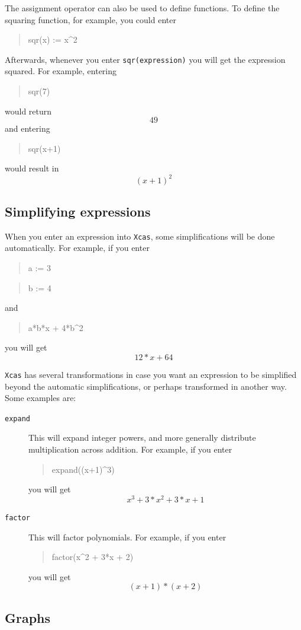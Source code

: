 \documentclass{article}
\newcommand{\xcasin}[1]
{\begin{quote}\ttfamily
#1
\end{quote}}
\newcommand{\xcasout}[1]
{\begin{equation*}
#1
\end{equation*}}
\begin{document}
The assignment operator can also be used to define functions.  To
define the squaring function, for example, you could enter
\xcasin{sqr(x) := x\^{}2}
Afterwards, whenever you enter \texttt{sqr(expression)} you will
get the expression squared.  For example, entering
\xcasin{sqr(7)}
would return
\xcasout{49}
and entering
\xcasin{sqr(x+1)}
would result in
\xcasout{(x+1)^2}

\subsection{Simplifying expressions}

When you enter an expression into \texttt{Xcas}, some simplifications
will be done automatically.  For example, if you enter
\xcasin{a := 3}
\xcasin{b := 4}
and
\xcasin{a*b*x + 4*b\^{}2}
you will get
\xcasout{12*x + 64}

\texttt{Xcas} has several transformations in case you want an
expression to be simplified beyond the automatic simplifications, or
perhaps transformed in another way.  Some examples are:
\begin{description}
  \item[\texttt{expand}]
  This will expand integer powers, and more generally distribute
  multiplication across addition.  For example, if you enter
  \xcasin{expand((x+1)\^{}3)}
  you will get
  \xcasout{x^3 + 3*x^2 + 3*x + 1}
  
  \item[\texttt{factor}]
  This will factor polynomials.  For example, if you enter
  \xcasin{factor(x\^{}2 + 3*x + 2)}
  you will get
  \xcasout{(x + 1)*(x + 2)}
\end{description}  

\subsection{Graphs}
\end{document}
